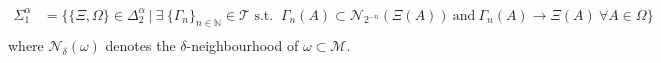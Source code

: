 \documentclass[a4paper,10pt]{article}
\begin{document}
\begin{equation*}
\begin{split}
\Sigma^{\alpha}_{1} &= \{\{\Xi,\Omega\} \in \Delta^{\alpha}_{2} \ \vert \  \exists \ \{\Gamma_{n}\}_{n\in \mathbb{N}} \in \mathcal{T}\text{ s.t. }  \ \Gamma_{n}(A) \subset \mathcal{N}_{2^{-n}}(\Xi(A))  \ \text{and}\ \Gamma_n(A)\rightarrow\Xi(A) \ \forall A \in \Omega\} \\
\end{split}
\end{equation*}
where $\mathcal{N}_{\delta}(\omega)$ denotes the $\delta$-neighbourhood of $\omega \subset \mathcal{M}.$


\small
%
%


\end{document}
